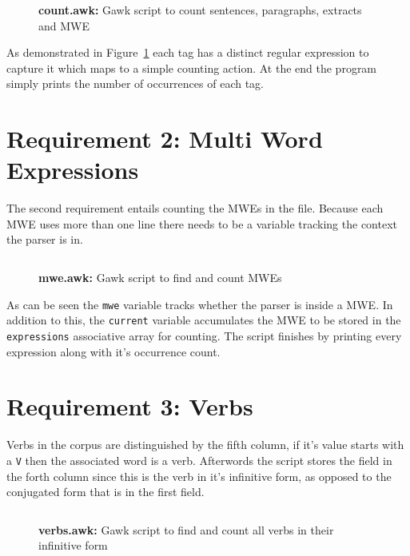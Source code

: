 \documentclass[a4paper]{report}
\begin{document}
\begin{figure}[H]
    \centering
    \inputminted[firstline=2]{awk}{../count.awk}
    \caption{\textbf{count.awk:} Gawk script to count sentences, paragraphs,
    extracts and MWE}\label{code:count}
\end{figure}

As demonstrated in Figure~\ref{code:count} each tag has a distinct regular
expression to capture it which maps to a simple counting action. At the end the
program simply prints the number of occurrences of each tag.

\section{Requirement 2: Multi Word Expressions}\label{sec:mwe}

The second requirement entails counting the MWEs in the file. Because each MWE
uses more than one line there needs to be a variable tracking the context the
parser is in.

\begin{figure}[H]
    \centering
    \inputminted[firstline=2]{awk}{../mwe.awk}
    \caption{\textbf{mwe.awk:} Gawk script to find and count MWEs}
\end{figure}

As can be seen the \texttt{mwe} variable tracks whether the parser is inside a
MWE\@. In addition to this, the \texttt{current} variable accumulates the MWE
to be stored in the \texttt{expressions} associative array for counting. The
script finishes by printing every expression along with it's occurrence count.

\section{Requirement 3: Verbs}\label{sec:verbs}

Verbs in the corpus are distinguished by the fifth column, if it's value starts
with a \texttt{V} then the associated word is a verb. Afterwords the script
stores the field in the forth column since this is the verb in it's infinitive
form, as opposed to the conjugated form that is in the first field.

\begin{figure}[H]
    \centering
    \inputminted[firstline=2]{awk}{../verbs.awk}
    \caption{\textbf{verbs.awk:} Gawk script to find and count all verbs in
    their infinitive form}
\end{figure}
\end{document}
